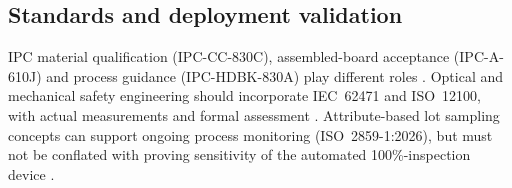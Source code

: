\subsection{Standards and deployment validation}
IPC material qualification (IPC-CC-830C), assembled-board acceptance (IPC-A-610J) and process guidance (IPC-HDBK-830A) play different roles \citep{ipccc830c,ipca610j,ipchdbk830a}. Optical and mechanical safety engineering should incorporate IEC~62471 and ISO~12100, with actual measurements and formal assessment \citep{iec62471,iso12100}. Attribute-based lot sampling concepts can support ongoing process monitoring (ISO~2859-1:2026), but must not be conflated with proving sensitivity of the automated 100\%-inspection device \citep{iso2859}.
